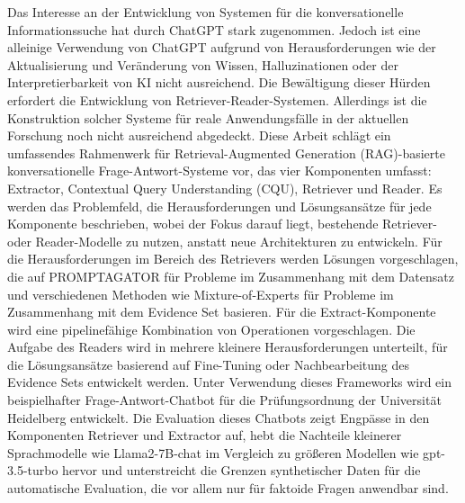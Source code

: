 Das Interesse an der Entwicklung von Systemen für die konversationelle Informationssuche hat durch ChatGPT stark zugenommen. Jedoch ist eine alleinige Verwendung von ChatGPT aufgrund von Herausforderungen wie der Aktualisierung und Veränderung von Wissen, Halluzinationen oder der Interpretierbarkeit von KI nicht ausreichend. Die Bewältigung dieser Hürden erfordert die Entwicklung von Retriever-Reader-Systemen. Allerdings ist die Konstruktion solcher Systeme für reale Anwendungsfälle in der aktuellen Forschung noch nicht ausreichend abgedeckt. Diese Arbeit schlägt ein umfassendes Rahmenwerk für Retrieval-Augmented Generation (RAG)-basierte konversationelle Frage-Antwort-Systeme vor, das vier Komponenten umfasst: Extractor, Contextual Query Understanding (CQU), Retriever und Reader. Es werden das Problemfeld, die Herausforderungen und Lösungsansätze für jede Komponente beschrieben, wobei der Fokus darauf liegt, bestehende Retriever- oder Reader-Modelle zu nutzen, anstatt neue Architekturen zu entwickeln. Für die Herausforderungen im Bereich des Retrievers werden Lösungen vorgeschlagen, die auf PROMPTAGATOR für Probleme im Zusammenhang mit dem Datensatz und verschiedenen Methoden wie Mixture-of-Experts für Probleme im Zusammenhang mit dem Evidence Set basieren. Für die Extract-Komponente wird eine pipelinefähige Kombination von Operationen vorgeschlagen. Die Aufgabe des Readers wird in mehrere kleinere Herausforderungen unterteilt, für die Lösungsansätze basierend auf Fine-Tuning oder Nachbearbeitung des Evidence Sets entwickelt werden. Unter Verwendung dieses Frameworks wird ein beispielhafter Frage-Antwort-Chatbot für die Prüfungsordnung der Universität Heidelberg entwickelt. Die Evaluation dieses Chatbots zeigt Engpässe in den Komponenten Retriever und Extractor auf, hebt die Nachteile kleinerer Sprachmodelle wie Llama2-7B-chat im Vergleich zu größeren Modellen wie gpt-3.5-turbo hervor und unterstreicht die Grenzen synthetischer Daten für die automatische Evaluation, die vor allem nur für faktoide Fragen anwendbar sind.